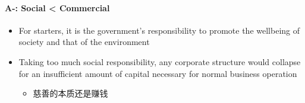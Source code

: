 \documentclass{article}
\begin{document}
      \paragraph{A-: Social < Commercial}
      \begin{itemize}
        \item For starters, it is the government's responsibility to promote
        the wellbeing of society and that of the environment
        \item Taking too much social responsibility, any corporate structure
        would collapse for an insufficient amount of capital necessary
        for normal business operation
        \begin{itemize}
          \item 慈善的本质还是赚钱
        \end{itemize}
      \end{itemize}
\end{document}
